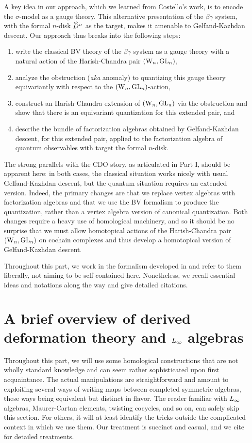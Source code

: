 A key idea in our approach, which we learned from Costello's work, is to encode the $\sigma$-model as a gauge theory. 
This alternative presentation of the $\beta\gamma$ system, with the formal $n$-disk $\widehat{D}^n$ as the target,
makes it amenable to Gelfand-Kazhdan descent.
Our approach thus breaks into the following steps:
\begin{enumerate}
\item write the classical BV theory of the $\beta\gamma$ system as a gauge theory with a natural action of the Harish-Chandra pair $({{\rm W}_n},{\rm GL}_n)$,
\item analyze the obstruction ({\em aka} anomaly) to quantizing this gauge theory equivariantly with respect to the $({{\rm W}_n},{\rm GL}_n)$-action,
\item construct an Harish-Chandra extension of $({{\rm W}_n},{\rm GL}_n)$ via the obstruction and show that there is an equivariant quantization for this extended pair, and
\item describe the bundle of factorization algebras obtained by
  Gelfand-Kazhdan descent, for this extended pair, applied to the
  factorization algebra of quantum observables with target the formal $n$-disk.
\end{enumerate}
The strong parallels with the CDO story, as articulated in Part I, should be apparent here: 
in both cases, the classical situation works nicely with usual Gelfand-Kazhdan descent, but the quantum situation requires an extended version.
Indeed, the primary changes are that we replace vertex algebras with factorization algebras and that we use the BV formalism to produce the quantization, rather than a vertex algebra version of canonical quantization.
Both changes require a heavy use of homological machinery, and so it should be no surprise that we must allow homotopical actions of the Harish-Chandra pair $({{\rm W}_n},{\rm GL}_n)$ on cochain complexes and thus develop a homotopical version of Gelfand-Kazhdan descent.

Throughout this part, we work in the formalism developed in \cite{CosBook,CG1, CG2}
and refer to them liberally, not aiming to be self-contained here.
Nonetheless, we recall essential ideas and notations along the way and give detailed citations.

\section{A brief overview of derived deformation theory and $\L8$ algebras}
\label{sec DDT}

Throughout this part, we will use some homological constructions 
that are not wholly standard knowledge and 
can seem rather sophisticated upon first acquaintance.
The actual manipulations are straightforward and 
amount to exploiting several ways of writing maps between completed symmetric algebras, 
these ways being equivalent but distinct in flavor.
The reader familiar with $\L8$ algebras, Maurer-Cartan elements, twisting cocycles,
and so on, can safely skip this section.
For others, it will at least identify the tricks outside the complicated context in which we use them.
Our treatment is succinct and casual, and we cite \cite{LV, Hinich, LurieSAG, CG2}
for detailed treatments.

